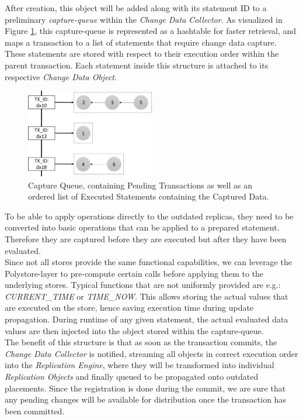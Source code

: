 After creation, this object will be added along with its statement ID to a preliminary \emph{capture-queue} within the \emph{Change Data Collector}. 
As visualized in Figure \ref{fig:hashtable}, this capture-queue is represented as a hashtable for 
faster retrieval, and maps a transaction to a list of statements that require change data capture. 
These statements are stored with respect to their execution order within the parent transaction.
Each statement inside this structure is attached to its respective \emph{Change Data Object}.

\begin{figure}[t]
    \centering
    \includegraphics[width=0.5\textwidth]{Figures/hashtable.png}
    \caption{Capture Queue, containing Pending Transactions as well as an ordered list of Executed Statements containing the Captured Data.}
    \label{fig:hashtable}
\end{figure}

To be able to apply operations directly to the outdated replicas, they need to be converted into basic operations that can be applied to a prepared statement.
Therefore they are captured before they are executed but after they have been evaluated.\\
Since not all stores provide the same functional capabilities, we can leverage the Polystore-layer to pre-compute certain calls before applying them to the underlying stores.
Typical functions that are not uniformly provided are e.g.: \emph{CURRENT\_TIME} or \emph{TIME\_NOW}. This allows storing the actual values that are executed on the store,
hence saving execution time during update propagation.
During runtime of any given statement, the actual evaluated data values are then injected into the object stored within the capture-queue.\\
The benefit of this structure is that as soon as the transaction commits, the \emph{Change Data Collector} is notified, streaming all objects in correct execution order
into the \emph{Replication Engine}, where they will be transformed into individual \emph{Replication Objects} and finally queued to be propagated onto outdated placements. 
Since the registration is done during the commit, we are sure that any pending changes will be available for distribution once the transaction has been committed.



